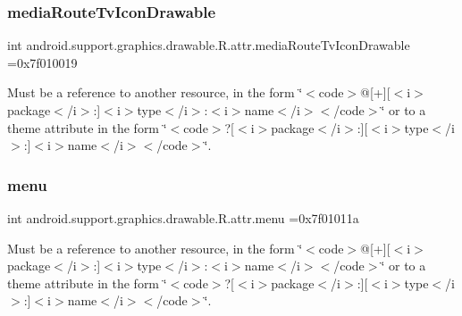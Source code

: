 \subsubsection{\texorpdfstring{media\+Route\+Tv\+Icon\+Drawable}{mediaRouteTvIconDrawable}}
{\footnotesize\ttfamily int android.\+support.\+graphics.\+drawable.\+R.\+attr.\+media\+Route\+Tv\+Icon\+Drawable =0x7f010019\hspace{0.3cm}{\ttfamily [static]}}

Must be a reference to another resource, in the form \char`\"{}$<$code$>$@\mbox{[}+\mbox{]}\mbox{[}$<$i$>$package$<$/i$>$\+:\mbox{]}$<$i$>$type$<$/i$>$\+:$<$i$>$name$<$/i$>$$<$/code$>$\char`\"{} or to a theme attribute in the form \char`\"{}$<$code$>$?\mbox{[}$<$i$>$package$<$/i$>$\+:\mbox{]}\mbox{[}$<$i$>$type$<$/i$>$\+:\mbox{]}$<$i$>$name$<$/i$>$$<$/code$>$\char`\"{}. \mbox{\label{classandroid_1_1support_1_1graphics_1_1drawable_1_1R_1_1attr_a4c5dd08fe2eee37f65519867b1431335}} 
\subsubsection{\texorpdfstring{menu}{menu}}
{\footnotesize\ttfamily int android.\+support.\+graphics.\+drawable.\+R.\+attr.\+menu =0x7f01011a\hspace{0.3cm}{\ttfamily [static]}}

Must be a reference to another resource, in the form \char`\"{}$<$code$>$@\mbox{[}+\mbox{]}\mbox{[}$<$i$>$package$<$/i$>$\+:\mbox{]}$<$i$>$type$<$/i$>$\+:$<$i$>$name$<$/i$>$$<$/code$>$\char`\"{} or to a theme attribute in the form \char`\"{}$<$code$>$?\mbox{[}$<$i$>$package$<$/i$>$\+:\mbox{]}\mbox{[}$<$i$>$type$<$/i$>$\+:\mbox{]}$<$i$>$name$<$/i$>$$<$/code$>$\char`\"{}. \mbox{\label{classandroid_1_1support_1_1graphics_1_1drawable_1_1R_1_1attr_aeff1e71679ba82412bbeeb5d2afa046f}} 
